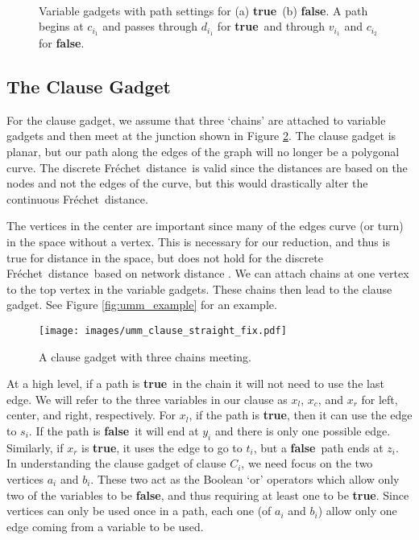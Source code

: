 \documentclass{article}[11pt]
\newcommand{\frechet}{Fr\'echet}
\newcommand{\dfd}{discrete \frechet\ distance}
\newcommand{\true}{\textbf{true}}
\newcommand{\false}{\textbf{false}}
\begin{document}
\begin{figure}[ht!]
\begin{center}
        \hspace*{.5cm}
         \\
\end{center}
\caption{Variable gadgets with path settings for (a) \true\ (b) \false. A path begins at $c_{i_1}$ and 
        passes through $d_{i_1}$ for \true\ and through $v_{i_1}$ and $c_{i_2}$ for \false.}
    \label{fig:umm_var}
\end{figure} 




\subsection{The Clause Gadget}
For the clause gadget, we assume that three `chains' are attached to variable gadgets
and then meet at the junction shown in Figure \ref{fig:umm_clause}. The clause gadget is
planar, but our path along the edges of the graph will no longer be a polygonal curve. 
The \dfd\ is valid since the distances are based on the nodes and not the edges
of the curve, but this would drastically alter the continuous \frechet\ distance.

The vertices in the center are important since many of the edges curve (or turn) in the
space without a vertex.  This is necessary for our reduction, and thus is true
for distance in the space, but does not hold for the \dfd\ based on network
distance \cite{Fan:2011:CGGA}.
We can attach chains at one vertex to the top vertex in the variable gadgets.
These chains then lead to the clause gadget.  See Figure \ref{fig:umm_example}
for an example.

\begin{figure}[!ht]
\centering
    \texttt{[image: images/umm\_clause\_straight\_fix.pdf]}
\caption{A clause gadget with three chains meeting.}
    \label{fig:umm_clause}
\end{figure}


At a high level, if a path is \true\ in the chain it will not need to use
the last edge.  We will refer to the three variables in our clause as $x_l$, $x_c$, and 
$x_r$ for left, center, and right, respectively.  For $x_l$, if the path is \true, then
it can use the edge to $s_i$.  If the path is \false\ it will end at $y_i$ and there is
only one possible edge.  Similarly, if $x_r$ is \true, it uses the edge to go to
$t_i$, but a \false\ path ends at $z_i$.
In understanding the clause gadget of clause $C_i$, we need focus on the two vertices
$a_i$ and $b_i$. These two act as the Boolean `or' operators which allow only two of the
variables to be \false, and thus requiring at least one to be \true.  Since vertices can
only be used once in a path, each one (of $a_i$ and $b_i$) allow only one edge coming
from a variable to be used.
\end{document}
